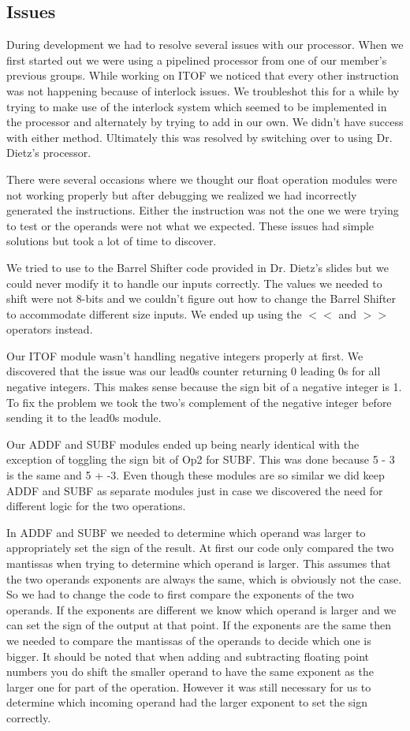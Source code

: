 \documentclass{article}
\begin{document}
\begin{multicols}{2}
  \section{Issues}
During development we had to resolve several issues with our processor. When we first started out we were using a pipelined processor from one of our member's previous groups. While working on ITOF we noticed that every other instruction was not happening because of interlock issues. We troubleshot this for a while by trying to make use of the interlock system which seemed to be implemented in the processor and alternately by trying to add in our own. We didn't have success with either method. Ultimately this was resolved by switching over to using Dr. Dietz's processor.

There were several occasions where we thought our float operation modules were not working properly but after debugging we realized we had incorrectly generated the instructions. Either the instruction was not the one we were trying to test or the operands were not what we expected.  These issues had simple solutions but took a lot of time to discover.

We tried to use to the Barrel Shifter code provided in Dr. Dietz's slides but we could never modify it to handle our inputs correctly. The values we needed to shift were not 8-bits and we couldn't figure out how to change the Barrel Shifter to accommodate different size inputs. We ended up using the $<<$ and $>>$ operators instead.

Our ITOF module wasn't handling negative integers properly at first. We discovered that the issue was our lead0s counter returning 0 leading 0s for all negative integers. This makes sense because the sign bit of a negative integer is 1. To fix the problem we took the two's complement of the negative integer before sending it to the lead0s module.

Our ADDF and SUBF modules ended up being nearly identical with the exception of toggling the sign bit of Op2 for SUBF. This was done because 5 - 3 is the same and 5 + -3. Even though these modules are so similar we did keep ADDF and SUBF as separate modules just in case we discovered the need for different logic for the two operations.

In ADDF and SUBF we needed to determine which operand was larger to appropriately set the sign of the result. At first our code only compared the two mantissas when trying to determine which operand is larger. This assumes that the two operands exponents are always the same, which is obviously not the case. So we had to change the code to first compare the exponents of the two operands. If the exponents are different we know which operand is larger and we can set the sign of the output at that point. If the exponents are the same then we needed to compare the mantissas of the operands to decide which one is bigger. It should be noted that when adding and subtracting floating point numbers you do shift the smaller operand to have the same exponent as the larger one for part of the operation. However it was still necessary for us to determine which incoming operand had the larger exponent to set the sign correctly.


\end{multicols}
\end{document}
